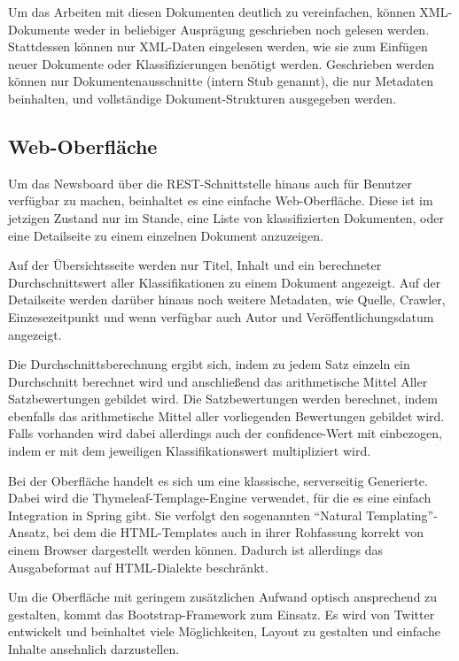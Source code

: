 Um das Arbeiten mit diesen Dokumenten deutlich zu vereinfachen, können XML-Dokumente
weder in beliebiger Ausprägung geschrieben noch gelesen werden. Stattdessen können
nur XML-Daten eingelesen werden, wie sie zum Einfügen neuer Dokumente
oder Klassifizierungen benötigt werden.
Geschrieben werden können nur Dokumentenausschnitte (intern Stub genannt),
die nur Metadaten beinhalten, und vollständige Dokument-Strukturen ausgegeben werden.

\subsection{Web-Oberfläche}
Um das Newsboard über die REST-Schnittstelle hinaus auch für Benutzer verfügbar zu machen,
beinhaltet es eine einfache Web-Oberfläche.
Diese ist im jetzigen Zustand nur im Stande, eine Liste von klassifizierten Dokumenten,
oder eine Detailseite zu einem einzelnen Dokument anzuzeigen.

Auf der Übersichtsseite werden nur Titel, Inhalt und ein berechneter Durchschnittswert
aller Klassifikationen zu einem Dokument angezeigt. Auf der Detailseite werden
darüber hinaus noch weitere Metadaten, wie Quelle, Crawler, Einzesezeitpunkt
und wenn verfügbar auch Autor und Veröffentlichungsdatum angezeigt.

Die Durchschnittsberechnung ergibt sich, indem zu jedem Satz einzeln ein Durchschnitt berechnet wird und anschließend das arithmetische Mittel Aller Satzbewertungen
gebildet wird. Die Satzbewertungen werden berechnet, indem ebenfalls das arithmetische Mittel aller vorliegenden Bewertungen gebildet wird. Falls vorhanden wird dabei allerdings
auch der confidence-Wert mit einbezogen, indem er mit dem jeweiligen Klassifikationswert
multipliziert wird.

Bei der Oberfläche handelt es sich um eine klassische, serverseitig Generierte.
Dabei wird die Thymeleaf-Templage-Engine verwendet, für die es eine einfach Integration in
Spring gibt. Sie verfolgt den sogenannten "`Natural Templating"'-Ansatz,
bei dem die HTML-Templates auch in ihrer Rohfassung korrekt von einem Browser
dargestellt werden können. Dadurch ist allerdings das Ausgabeformat
auf HTML-Dialekte beschränkt.

Um die Oberfläche mit geringem zusätzlichen Aufwand optisch ansprechend zu gestalten,
kommt das Bootstrap-Framework zum Einsatz. Es wird von Twitter entwickelt und
beinhaltet viele Möglichkeiten, Layout zu gestalten und einfache Inhalte
ansehnlich darzustellen\cite{bootstrap}.


